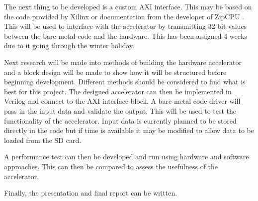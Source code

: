 The next thing to be developed is a custom AXI interface. This may be based on the code provided by Xilinx or documentation from the developer of ZipCPU \cite{axi_lite_custom}. This will be used to interface with the accelerator by transmitting 32-bit values between the bare-metal code and the hardware. This has been assigned 4 weeks due to it going through the winter holiday.

Next research will be made into methods of building the hardware accelerator and a block design will be made to show how it will be structured before beginning development. Different methods should be considered to find what is best for this project. The designed accelerator can then be implemented in Verilog and connect to the AXI interface block. A bare-metal code driver will pass in the input data and validate the output. This will be used to test the functionality of the accelerator. Input data is currently planned to be stored directly in the code but if time is available it may be modified to allow data to be loaded from the SD card.

A performance test can then be developed and run using hardware and software approaches. This can then be compared to assess the usefulness of the accelerator.

Finally, the presentation and final report can be written.